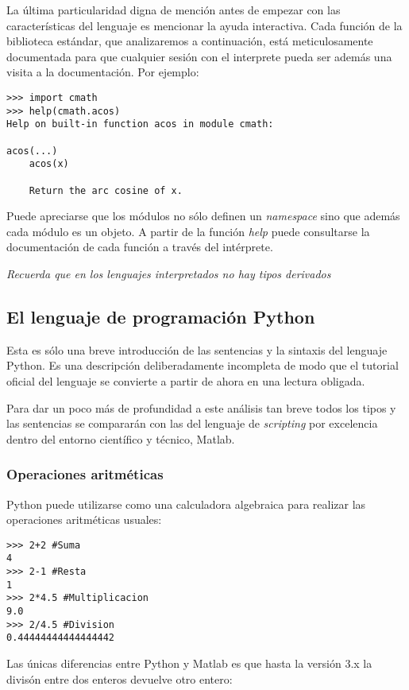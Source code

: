 \documentclass[a4paper,10pt]{article}
\begin{document}
La última particularidad digna de mención antes de empezar con las
características del lenguaje es mencionar la ayuda interactiva.  Cada
función de la biblioteca estándar, que analizaremos a continuación,
está meticulosamente documentada para que cualquier sesión con el
interprete pueda ser además una visita a la documentación.  Por
ejemplo:

\begin{lstlisting}
>>> import cmath
>>> help(cmath.acos)
Help on built-in function acos in module cmath:

acos(...)
    acos(x)

    Return the arc cosine of x.
\end{lstlisting}

Puede apreciarse que los módulos no sólo definen un \emph{namespace}
sino que además cada módulo es un objeto.  A partir de la función
\emph{help} puede consultarse la documentación de cada función a
través del intérprete.

\emph{Recuerda que en los lenguajes interpretados no hay tipos derivados}
\subsection{El lenguaje de programación Python}

Esta es sólo una breve introducción de las sentencias y la sintaxis
del lenguaje Python.  Es una descripción deliberadamente incompleta de
modo que el tutorial oficial del lenguaje\cite{TUT} se convierte a
partir de ahora en una lectura obligada.

Para dar un poco más de profundidad a este análisis tan breve todos
los tipos y las sentencias se compararán con las del lenguaje de
\emph{scripting} por excelencia dentro del entorno científico y
técnico, Matlab.

\subsubsection{Operaciones aritméticas}

Python puede utilizarse como una calculadora algebraica para realizar
las operaciones aritméticas usuales:

\begin{lstlisting}
>>> 2+2 #Suma
4
>>> 2-1 #Resta
1
>>> 2*4.5 #Multiplicacion
9.0
>>> 2/4.5 #Division
0.44444444444444442
\end{lstlisting}

Las únicas diferencias entre Python y Matlab es que hasta la versión 3.x
la divisón entre dos enteros devuelve otro entero:
\end{document}
